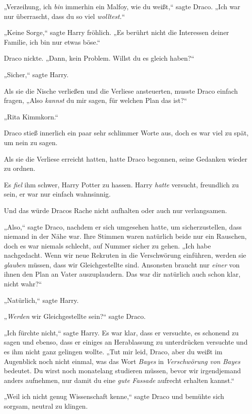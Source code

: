 {„Verzeihung, ich \emph{bin} immerhin ein Malfoy, wie du weißt,“ sagte Draco. „Ich war nur überrascht, dass du so viel \emph{wolltest.}“

„Keine Sorge,“ sagte Harry fröhlich. „Es berührt nicht die Interessen deiner Familie, ich bin nur etwas böse.“

Draco nickte. „Dann, kein Problem. Willst du es gleich haben?“

„Sicher,“ sagte Harry.

Als sie die Nische verließen und die Verliese ansteuerten, musste Draco einfach fragen, „Also \emph{kannst} du mir sagen, für welchen Plan das ist?“

„Rita Kimmkorn.“

Draco stieß innerlich ein paar sehr schlimmer Worte aus, doch es war viel zu spät, um nein zu sagen.

\later

Als sie die Verliese erreicht hatten, hatte Draco begonnen, seine Gedanken wieder zu ordnen.

Es \emph{fiel} ihm schwer, Harry Potter zu hassen. Harry \emph{hatte} versucht, freundlich zu sein, er war nur einfach wahnsinnig.

Und das würde Dracos Rache nicht aufhalten oder auch nur verlangsamen.

„Also,“ sagte Draco, nachdem er sich umgesehen hatte, um sicherzustellen, dass niemand in der Nähe war. Ihre Stimmen waren natürlich beide nur ein Rauschen, doch es war niemals schlecht, auf Nummer sicher zu gehen. „Ich habe nachgedacht. Wenn wir neue Rekruten in die Verschwörung einführen, werden sie \emph{glauben} müssen, dass wir Gleichgestellte sind. Ansonsten braucht nur \emph{einer} von ihnen den Plan an Vater auszuplaudern. Das war dir natürlich auch schon klar, nicht wahr?“

„Natürlich,“ sagte Harry.

„\emph{Werden} wir Gleichgestellte sein?“ sagte Draco.

„Ich fürchte nicht,“ sagte Harry. Es war klar, dass er versuchte, es schonend zu sagen und ebenso, dass er einiges an Herablassung zu unterdrücken versuchte und es ihm nicht ganz gelingen wollte. „Tut mir leid, Draco, aber du weißt im Augenblick noch nicht einmal, was das Wort \emph{Bayes} in \emph{Verschwörung von Bayes} bedeutet. Du wirst noch monatelang studieren müssen, bevor wir irgendjemand anders aufnehmen, nur damit du eine \emph{gute Fassade} aufrecht erhalten kannst.“

„Weil ich nicht genug Wissenschaft kenne,“ sagte Draco und bemühte sich sorgsam, neutral zu klingen.

}
